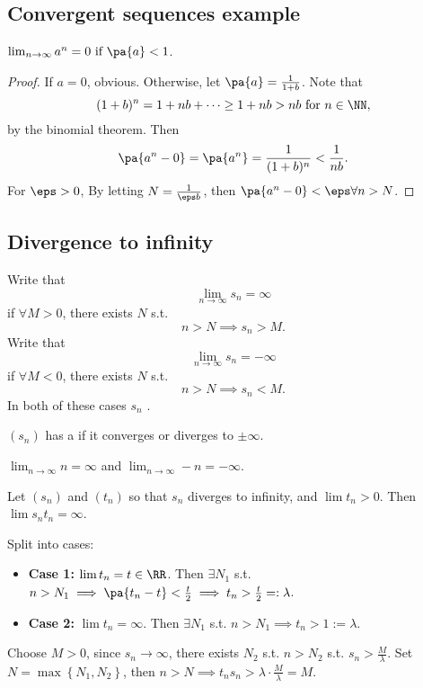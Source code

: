 \documentclass[11pt]{scrartcl}
\numberwithin{equation}{section}
\begin{document}
\subsection{Convergent sequences example}

\begin{example}
    $\lim_{n\rightarrow\infty}a^n = 0 \text{ if } \pa{a} < 1$.
    \begin{proof}
        If $a=0$, obvious. Otherwise, let $\pa{a}=\frac{1}{1+b}$.
        Note that 
        \[ (1+b)^n = 1+nb+\cdots \geq 1 +nb > nb \text{ for } n\in\NN,\]
        by the binomial theorem. Then 
        \[ \pa{a^n-0}=\pa{a^n}=\frac{1}{(1+b)^n} < \frac{1}{nb}. \]
        For $\eps > 0$, By letting $N=\frac{1}{\eps b}$, then 
        $\pa{a^n-0}<\eps \forall n > N$.
    \end{proof}
\end{example}

\subsection{Divergence to infinity}

\begin{definition}
    Write that 
    \[ \lim_{n\rightarrow \infty}s_n = \infty \]
    if $\forall M>0$, there exists $N$ s.t. 
    \[ n>N \implies s_n>M. \]
    Write that 
    \[ \lim_{n\rightarrow \infty}s_n = -\infty \]
    if $\forall M<0$, there exists $N$ s.t. 
    \[ n>N \implies s_n<M. \]
    In both of these cases $s_n$ .
\end{definition}

\begin{definition}
    $(s_n)$ has a  if it converges or diverges to $\pm\infty$.
\end{definition}

\begin{example}
    $\lim_{n\rightarrow\infty}n = \infty$ and 
    $\lim_{n\rightarrow\infty}-n = -\infty$.
\end{example}

\begin{proposition}
    Let $(s_n)$ and $(t_n)$ so that $s_n$ diverges to infinity, and 
    $\lim t_n > 0$.
    Then $\lim s_n t_n = \infty$.
\end{proposition}

\begin{subproof}
    Split into cases:
    \begin{itemize}
        \item \textbf{Case 1: }$\lim t_n=t \in\RR$. Then 
        $\exists N_1$ s.t. $n>N_1\implies \pa{t_n-t}<\frac{t}{2}
        \implies t_n>\frac{t}{2} =: \lambda$.
        \item \textbf{Case 2: }$\lim t_n=\infty$. Then
        $\exists N_1$ s.t. $n>N_1\implies t_n>1 := \lambda$.
    \end{itemize}
    Choose $M>0$, since $s_n\rightarrow \infty$, there exists $N_2$ s.t.
    $n>N_2$ s.t. $s_n >\frac{M}{\lambda}$. Set $N=\max \left\{N_1,N_2\right\}$, then $n>N \implies t_ns_n > \lambda \cdot\frac{M}{\lambda}=M$.
\end{subproof}
\end{document}
